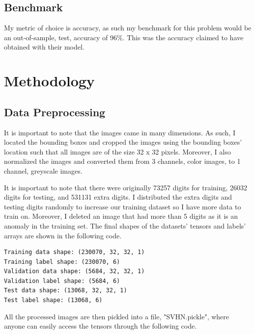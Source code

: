 \documentclass[twoside, column]{article}
\begin{document}
\subsection{Benchmark}

My metric of choice is accuracy, as such my benchmark for this problem would be an out-of-sample, test, accuracy of  96\%. This was the accuracy \cite{Goodfellow:2013aa} claimed to have obtained with their model.


\section{Methodology}


\subsection{Data Preprocessing}

It is important to note that the images came in many dimensions. As such, I located the bounding boxes and cropped the images using the bounding boxes' location such that all images are of the size 32 x 32 pixels. Moreover, I also normalized the images and converted them from 3 channels, color images, to 1 channel, greyscale images. 

It is important to note that there were originally 73257 digits for training, 26032 digits for testing, and 531131 extra digits. I distributed the extra digits and testing digits randomly to increase our training dataset so I have more data to train on. Moreover, I deleted an image that had more than 5 digits as it is an anomaly in the training set. The final shapes of the datasets' tensors and labels' arrays are shown in the following code.

\begin{verbatim}
Training data shape: (230070, 32, 32, 1)
Training label shape: (230070, 6)
Validation data shape: (5684, 32, 32, 1)
Validation label shape: (5684, 6)
Test data shape: (13068, 32, 32, 1)
Test label shape: (13068, 6)
 \end{verbatim}
 
All the processed images are then pickled into a file, "SVHN.pickle", where anyone can easily access the tensors through the following code. 
 
\end{document}

